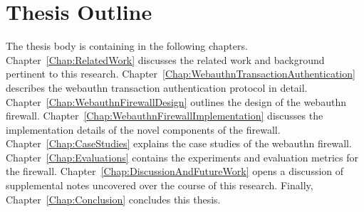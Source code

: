 




\section{Thesis Outline}

The thesis body is containing in the following chapters. Chapter~\ref{Chap:RelatedWork} discusses the related work and background pertinent to this research. Chapter~\ref{Chap:WebauthnTransactionAuthentication} describes the webauthn transaction authentication protocol in detail. Chapter~\ref{Chap:WebauthnFirewallDesign} outlines the design of the webauthn firewall. Chapter~\ref{Chap:WebauthnFirewallImplementation} discusses the implementation details of the novel components of the firewall. Chapter~\ref{Chap:CaseStudies} explains the case studies of the webauthn firewall. Chapter~\ref{Chap:Evaluations} contains the experiments and evaluation metrics for the firewall. Chapter~\ref{Chap:DiscussionAndFutureWork} opens a discussion of supplemental notes uncovered over the course of this research. Finally, Chapter~\ref{Chap:Conclusion} concludes this thesis.

